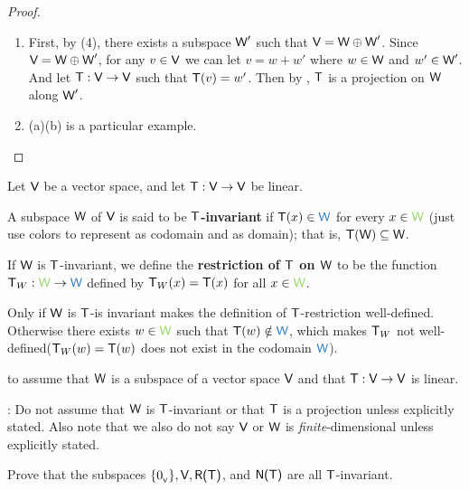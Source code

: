 \begin{proof} \ 
\begin{enumerate}
\item First, by (4), there exists a subspace \(\textsf{W}'\) such that \(\textsf{V} = \textsf{W} \oplus \textsf{W}'\).
Since \(\textsf{V} = \textsf{W} \oplus \textsf{W}'\), for any \(v \in \textsf{V}\) we can let \(v = w + w'\) where \(w \in \textsf{W}\) and \(w' \in \textsf{W}'\).
And let \(\textsf{T} : \textsf{V} \to \textsf{V}\) such that \(\textsf{T}(v) = w'\).
Then by , \(\textsf{T}\) is a projection on \(\W\) along \(\textsf{W}'\).

\item {}(a)(b) is a particular example.
\end{enumerate}
\end{proof}

\begin{additional definition} \label{adef 2.3}
Let \(\textsf{V}\) be a vector space, and let \(\textsf{T} : \textsf{V} \to \textsf{V}\) be linear.

 A subspace \(\W\) of \(\textsf{V}\) is said to be \textbf{\(\textsf{T}\)-invariant} if \(\T(x) \in \BLUE{\W}\) for every \(x \in \GREEN{\W}\)
(just use colors to represent \BLUE{\(\W\)} as codomain and \GREEN{\(\W\)} as domain);
that is, \(\textsf{T}(\textsf{W}) \subseteq \textsf{W}\).

 If \(\W\) is \(\textsf{T}\)-invariant, we define the \textbf{restriction of \(\textsf{T}\) on \(\W\)} to
be the function \(\T_W : \GREEN{\W} \to \BLUE{\W}\) defined by \(\textsf{T}_W(x) = \textsf{T}(x)\) for all \(x \in \GREEN{\W}\).
\end{additional definition}

\begin{note}
Only if \(\W\) is \(\textsf{T}\)-is invariant makes the definition of \(\textsf{T}\)-restriction well-defined.
Otherwise there exists \(w \in \GREEN{\W}\) such that \(\T(w) \notin \BLUE{\W}\), which makes \(\textsf{T}_W\) not well-defined(\(\textsf{T}_W(w) = \textsf{T}(w)\) does not exist in the codomain \(\BLUE{\W}\)).
\end{note}

\begin{note}
 to  assume that \(\W\) is a subspace of a vector space \(\textsf{V}\) and that \(\textsf{T} : \textsf{V} \to \textsf{V}\) is linear.

: Do not assume that \(\W\) is \(\textsf{T}\)-invariant or that \(\textsf{T}\) is a projection unless explicitly stated.
Also note that we also do not say \(\textsf{V}\) or \(\W\) is \emph{finite}-dimensional unless explicitly stated.
\end{note}

\begin{exercise} \label{exercise 2.1.29}
Prove that the subspaces \(\{ 0_{_{\textsf{V}}} \}, \textsf{V}, \textsf{R(T)}\), and \(\textsf{N(T)}\) are all \(\textsf{T}\)-invariant.
\end{exercise}

